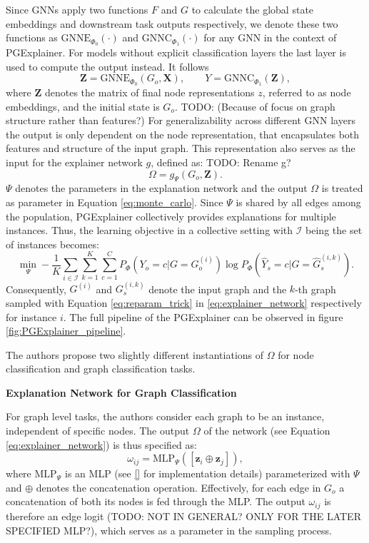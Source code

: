 Since GNNs apply two functions $F$ and $G$ to calculate the global state embeddings and downstream task outputs respectively, we denote these two functions as $\text{GNNE}_{\Phi_0}(\cdot)$ and $\text{GNNC}_{\Phi_1}(\cdot)$ for any GNN in the context of PGExplainer. For models without explicit classification layers the last layer is used to compute the output instead. It follows
\begin{equation}
    \mathbf{Z} = \text{GNNE}_{\Phi_0}(G_o, \mathbf{X}), \qquad Y = \text{GNNC}_{\Phi_1}(\mathbf{Z}),
\end{equation}
where $\mathbf{Z}$ denotes the matrix of final node representations $z$, referred to as node embeddings, and the initial state is $G_o$. TODO: (Because of focus on graph structure rather than features?) For generalizability across different GNN layers the output is only dependent on the node representation, that encapsulates both features and structure of the input graph. This representation also serves as the input for the explainer network $g$, defined as:
TODO: Rename g?
\begin{equation}
    \label{eq:explainer_network}
    \Omega = g_\Psi(G_o,\mathbf{Z}).
\end{equation}
$\Psi$ denotes the parameters in the explanation network and the output $\Omega$ is treated as parameter in Equation \ref{eq:monte_carlo}. Since $\Psi$ is shared by all edges among the population, PGExplainer collectively provides explanations for multiple instances. Thus, the learning objective in a collective setting with $\mathcal{I}$ being the set of instances becomes:
\begin{equation}
    \label{eq:mlp_loss}
    \min_\Psi -\frac{1}{K}\sum_{i\in \mathcal{I}}\sum_{k=1}^K\sum_{c=1}^C P_\Phi (Y_o = c|G = G_o^{(i)}) \log P_\Phi(\hat{Y}_s = c|G=\hat{G}_s^{(i,k)}).
\end{equation}
Consequently, $G^{(i)}$ and $G_s^{(i,k)}$ denote the input graph and the $k$-th graph sampled with Equation \ref{eq:reparam_trick} in \ref{eq:explainer_network} respectively for instance $i$. The full pipeline of the PGExplainer can be observed in figure \ref{fig:PGExplainer_pipeline}. 

The authors propose two slightly different instantiations of $\Omega$ for node classification and graph classification tasks.\bigskip

\textbf{Explanation Network for Graph Classification}\par
For graph level tasks, the authors consider each graph to be an instance, independent  of specific nodes. The output $\Omega$ of the network (see Equation \ref{eq:explainer_network}) is thus specified as:
\begin{equation}
    \label{eq:mlp_graph_input}
    \omega_{ij} = \text{MLP}_\Psi ([\mathbf{z}_i\oplus\mathbf{z}_j]),
\end{equation}
where $\text{MLP}_\Psi$ is an MLP (see \ref{} for implementation details) parameterized with $\Psi$ and $\oplus$ denotes the concatenation operation. Effectively, for each edge in $G_o$ a concatenation of both its nodes is fed through the MLP. The output $\omega_{ij}$ is therefore an edge logit (TODO: NOT IN GENERAL? ONLY FOR THE LATER SPECIFIED MLP?), which serves as a parameter in the sampling process. \bigskip

